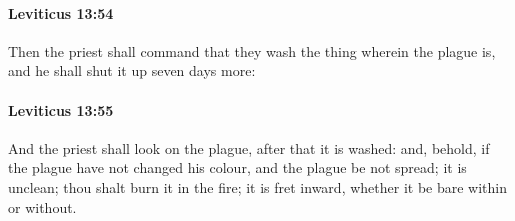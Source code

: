 		\paragraph{Leviticus 13:54} %
			\label{LEVITICUS-13-54}

			Then the priest shall command that they wash the thing wherein the plague is, and he shall shut it up seven days more:


		\paragraph{Leviticus 13:55} %
			\label{LEVITICUS-13-55}

			And the priest shall look on the plague, after that it is washed: and, behold, if the plague have not changed his colour, and the plague be not spread; it is unclean; thou shalt burn it in the fire; it is fret inward, whether it be bare within or without.

